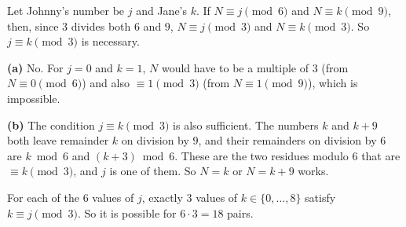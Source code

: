 Let Johnny's number be $j$ and Jane's $k$. If $N\equiv j\pmod6$ and $N\equiv k\pmod9$, then, since $3$ divides both $6$ and $9$, $N\equiv j\pmod3$ and $N\equiv k\pmod3$. So $j\equiv k\pmod3$ is necessary.

\textbf{(a)} $\boxed{\text{No}}$. For $j=0$ and $k=1$, $N$ would have to be a multiple of $3$ (from $N\equiv0\pmod6$) and also $\equiv1\pmod3$ (from $N\equiv1\pmod9$), which is impossible.

\textbf{(b)} The condition $j\equiv k\pmod3$ is also sufficient. The numbers $k$ and $k+9$ both leave remainder $k$ on division by $9$, and their remainders on division by $6$ are $k\bmod6$ and $(k+3)\bmod6$. These are the two residues modulo $6$ that are $\equiv k\pmod3$, and $j$ is one of them. So $N=k$ or $N=k+9$ works.

For each of the $6$ values of $j$, exactly $3$ values of $k\in\{0,\dots,8\}$ satisfy $k\equiv j\pmod3$. So it is possible for $6\cdot3=\boxed{18}$ pairs.
